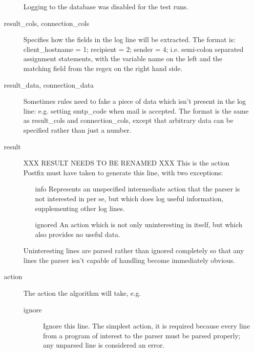\documentclass[a4paper,12pt,draft]{article}
\begin{document}
\begin{description}
        Logging to the database was disabled for the test runs.

    \item [result\_cols, connection\_cols] Specifies how the fields in
        the log line will be extracted.  The format is: \newline
        client\_hostname = 1; recipient = 2; sender = 4; \newline
        i.e. semi-colon separated assignment statements, with the variable
        name on the left and the matching field from the regex on the
        right hand side.

    \item [result\_data, connection\_data] Sometimes rules need to fake a
        piece of data which isn't present in the log line: e.g. setting
        smtp\_code when mail is accepted.  The format is the same as
        result\_cols and connection\_cols, except that arbitrary data can
        be specified rather than just a number.

    \item [result]  XXX RESULT NEEDS TO BE RENAMED XXX This is the action
        Postfix must have taken to generate this line, with two exceptions:

        \begin{itemize}

            \item [info] Represents an unspecified intermediate action that
                the parser is not interested in per se, but which does log
                useful information, supplementing other log lines.

            \item [ignored] An action which is not only uninteresting in
                itself, but which also provides no useful data.

        \end{itemize}

        Uninteresting lines are parsed rather than ignored completely so
        that any lines the parser isn't capable of handling become
        immediately obvious.

    \item [action] The action the algorithm will take, e.g.
        \begin{description}

            \item [ignore] Ignore this line.  The simplest action, it is
                required because every line from a program of interest to
                the parser must be parsed properly; any unparsed line is
                considered an error.


\end{description}
\end{description}
\end{document}
